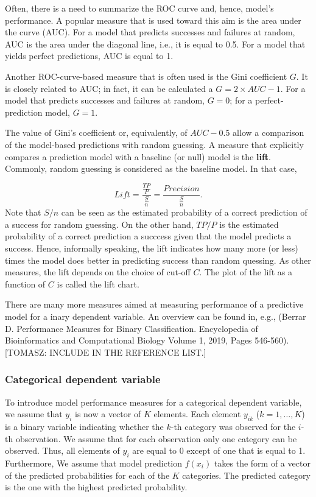 \documentclass[12pt,]{krantz}
\begin{document}
Often, there is a need to summarize the ROC curve and, hence, model's performance. A popular measure that is used toward this aim is the area under the curve (AUC). For a model that predicts successes and failures at random, AUC is the area under the diagonal line, i.e., it is equal to 0.5. For a model that yields perfect predictions, AUC is equal to 1.

Another ROC-curve-based measure that is often used is the Gini coefficient \(G\). It is closely related to AUC; in fact, it can be calculated a \(G = 2 \times AUC - 1\). For a model that predicts successes and failures at random, \(G=0\); for a perfect-prediction model, \(G = 1\).

The value of Gini's coefficient or, equivalently, of \(AUC-0.5\) allow a comparison of the model-based predictions with random guessing. A measure that explicitly compares a prediction model with a baseline (or null) model is the \textbf{lift}. Commonly, random guessing is considered as the baseline model. In that case,

\[
Lift  = \frac{\frac{TP}{P}}{\frac{S}{n}} = \frac{Precision}{\frac{S}{n}}.
\]
Note that \(S/n\) can be seen as the estimated probability of a correct prediction of a success for random guessing. On the other hand, \(TP/P\) is the estimated probability of a correct prediction a succcess given that the model predicts a success. Hence, informally speaking, the lift indicates how many more (or less) times the model does better in predicting success than random quessing. As other measures, the lift depends on the choice of cut-off \(C\). The plot of the lift as a function of \(C\) is called the lift chart.

There are many more measures aimed at measuring performance of a predictive model for a inary dependent variable. An overview can be found in, e.g., (Berrar D. Performance Measures for Binary Classification. Encyclopedia of Bioinformatics and Computational Biology Volume 1, 2019, Pages 546-560). {[}TOMASZ: INCLUDE IN THE REFERENCE LIST.{]}

\hypertarget{modelPerformanceMethodCateg}{%
\subsubsection{Categorical dependent variable}\label{modelPerformanceMethodCateg}}

To introduce model performance measures for a categorical dependent variable, we assume that \(y_i\) is now a vector of \(K\) elements. Each element \(y_{ik}\) (\(k=1,\ldots,K\)) is a binary variable indicating whether the \(k\)-th category was observed for the \(i\)-th observation. We assume that for each observation only one category can be observed. Thus, all elements of \(y_i\) are equal to 0 except of one that is equal to 1. Furthermore, We assume that model prediction \(f(x_i)\) takes the form of a vector of the predicted probabilities for each of the \(K\) categories. The predicted category is the one with the highest predicted probability.
\end{document}
